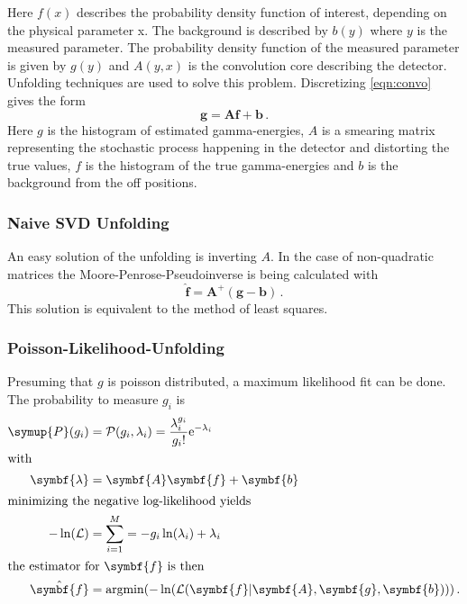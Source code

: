 Here $f(x)$ describes the probability density function of interest, depending on the physical parameter x.
The background is described by $b(y)$ where $y$ is the measured parameter.
The probability density function of the measured parameter is given by $g(y)$ and $A(y,x)$ is the convolution core describing the detector.
Unfolding techniques are used to solve this problem.
Discretizing \eqref{eqn:convo} gives the form
\begin{equation}
  \symbf{g} = \symbf{A}\symbf{f} + \symbf{b} \, .
\end{equation}
Here $g$ is the histogram of estimated gamma-energies, $A$ is a smearing matrix representing the stochastic process happening in the detector and distorting the true values, $f$ is the histogram of the true gamma-energies and $b$ is the background from the off positions.

\subsubsection{Naive SVD Unfolding}
An easy solution of the unfolding is inverting $A$.
In the case of non-quadratic matrices the Moore-Penrose-Pseudoinverse is being calculated with
\begin{equation}
  \hat{\symbf{f}} = \symbf{A}^{+}(\symbf{g} - \symbf{b}) \, .
  \label{eqn:svd}
\end{equation}
This solution is equivalent to the method of least squares.

\subsubsection{Poisson-Likelihood-Unfolding}
Presuming that $g$ is poisson distributed, a maximum likelihood fit can be done.
The probability to measure $g_i$ is
\begin{align}
  \symup{P}(g_i) &= \mathcal{P}(g_i, \lambda_i) = \frac{\lambda_i^{g_i}}{g_i!}\text{e}^{-\lambda_i} \\
  \shortintertext{with}
  \symbf{\lambda} &= \symbf{A}\symbf{f} + \symbf{b} \\
  \intertext{minimizing the negative log-likelihood yields}
  -\ln(\mathcal{L}) &= \sum_{i=1}^{M} = -g_i \ln(\lambda_i) + \lambda_i \\
  \intertext{the estimator for $\symbf{f}$ is then}
  \hat{\symbf{f}} &= \text{argmin}(-\ln(\mathcal{L}(\symbf{f}|\symbf{A},\symbf{g},\symbf{b})))\, .
\end{align}
